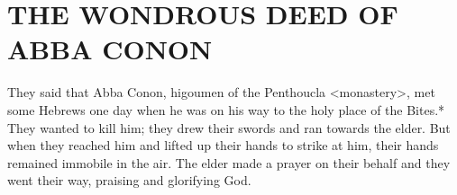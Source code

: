 \chapter{THE WONDROUS DEED OF ABBA CONON}

They said that Abba Conon, higoumen of the Penthoucla <monastery>, met some Hebrews one day when he was on his way to the holy place of the Bites.*
They wanted to kill him; they drew their swords and ran towards the elder.
But when they reached him and lifted up their hands to strike at him, their hands remained immobile in the air.
The elder made a prayer on their behalf and they went their way, praising and glorifying God.
